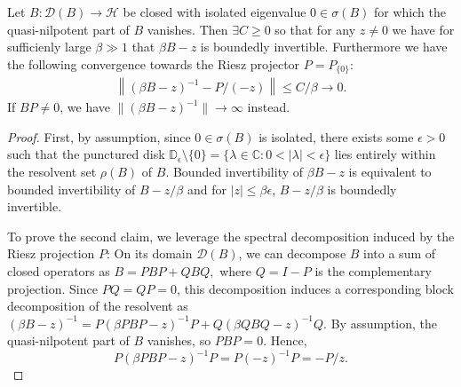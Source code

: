 \documentclass[10pt,a4paper]{amsart}
\begin{document}
\begin{Lem}\label{conv_to_projection}
	Let $B: \mathcal{D}(B) \rightarrow \mathcal{H}$ be closed  with  isolated eigenvalue $0\in \sigma(B)$  for which the quasi-nilpotent part of $B$ vanishes. Then $ \exists C \geq 0$ so that for any $z \neq 0$ we have for sufficienly large $\beta \gg 1$ that $\beta B - z$ is boundedly invertible. Furthermore we have  the following  convergence  towards the Riesz projector $P = P_{\{0\}} $:
	\begin{align}\label{convergence_to_projection}
		\left\|(\beta B - z)^{-1} - P/(-z) \right\| \leq C/\beta \longrightarrow 0.
	\end{align}
	If $B P \neq 0$, we have $\|(\beta B - z)^{-1} \| \rightarrow \infty$ instead.
\end{Lem}

\begin{proof}
	First, by assumption, since $0 \in \sigma(B)$ is isolated, 
	there exists some $\epsilon > 0$ such that the punctured disk
	$
	\mathbb{D}_\epsilon \setminus \{0\} = \{ \lambda \in \mathbb{C} : 0 < |\lambda| < \epsilon \}
	$
	lies entirely within the resolvent set $\rho(B)$ of $B$. Bounded invertibility of $\beta B - z$ is equivalent to bounded invertibility of
	$
	B - z/\beta
	$
	and for $|z| \leq \beta \epsilon$, $ B - z/\beta$ is boundedly invertible.
	
	
	
	To prove the second claim, we leverage the spectral decomposition induced by the Riesz projection $P$:
	On its domain $\mathcal{D}(B)$, we can decompose $B$ into a sum of closed operators as
	$
	B = P B P + Q B Q,
	$
	where $Q = I - P$ is the complementary projection. 
	Since $PQ = QP = 0$, this decomposition induces a corresponding block decomposition of the resolvent as
	$
	(\beta B - z)^{-1} = P (\beta P B P - z)^{-1} P + Q (\beta Q B Q - z)^{-1} Q.
	$
	By assumption, the quasi-nilpotent part of $B$ vanishes, so $P B P = 0$. Hence,
	\[
	P (\beta P B P - z)^{-1} P = P (-z)^{-1} P = - P/z.
	\]
	

\end{proof}
\end{document}
